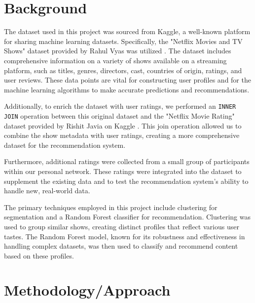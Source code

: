\documentclass[sigconf]{acmart}
\begin{document}
	\section{Background}
	The dataset used in this project was sourced from Kaggle, a well-known platform for sharing machine learning datasets. Specifically, the "Netflix Movies and TV Shows" dataset provided by Rahul Vyas was utilized \cite{kaggle_dataset}. The dataset includes comprehensive information on a variety of shows available on a streaming platform, such as titles, genres, directors, cast, countries of origin, ratings, and user reviews. These data points are vital for constructing user profiles and for the machine learning algorithms to make accurate predictions and recommendations.
	
	Additionally, to enrich the dataset with user ratings, we performed an \texttt{INNER JOIN} operation between this original dataset and the "Netflix Movie Rating" dataset provided by Rishit Javia on Kaggle \cite{netflix_ratings}. This join operation allowed us to combine the show metadata with user ratings, creating a more comprehensive dataset for the recommendation system.
	
	Furthermore, additional ratings were collected from a small group of participants within our personal network. These ratings were integrated into the dataset to supplement the existing data and to test the recommendation system's ability to handle new, real-world data.
	
	The primary techniques employed in this project include clustering for segmentation and a Random Forest classifier for recommendation. Clustering was used to group similar shows, creating distinct profiles that reflect various user tastes. The Random Forest model, known for its robustness and effectiveness in handling complex datasets, was then used to classify and recommend content based on these profiles.
	\section{Methodology/Approach}
\end{document}
